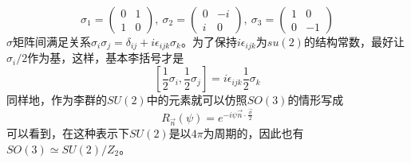 \documentclass[a4paper,11pt]{ctexart}
\newcommand{\beq}{\begin{equation}}
\newcommand{\eeq}{\end{equation}}
\begin{document}
\beq
\sigma_1 = \begin{pmatrix} 0 &1 \\ 1 &0\end{pmatrix},\ \sigma_2 = \begin{pmatrix} 0 & -i \\ i & 0 \end{pmatrix},\ \sigma_3 = \begin{pmatrix} 1 & 0 \\  0 & -1 \end{pmatrix}
\eeq
$\sigma$矩阵间满足关系$\sigma_i \sigma_j = \delta_{ij}+i \epsilon_{ijk} \sigma_k$。为了保持$i\epsilon_{ijk}$为$su(2)$的结构常数，最好让$\sigma_i /2$作为基，这样，基本李括号才是
\beq
\left[\frac{1}{2}\sigma_i,\frac{1}{2}\sigma_j\right] = i\epsilon_{ijk} \frac{1}{2} \sigma_k
\eeq
同样地，作为李群的$SU(2)$中的元素就可以仿照$SO(3)$的情形写成
\beq
R_{\vec{n}} (\psi) = e^{-i \psi \vec{n} \cdot \frac{\vec{\sigma}}{2}}
\eeq
可以看到，在这种表示下$SU(2)$是以$4\pi$为周期的，因此也有$SO(3) \simeq SU(2)/Z_2$。
\end{document}
